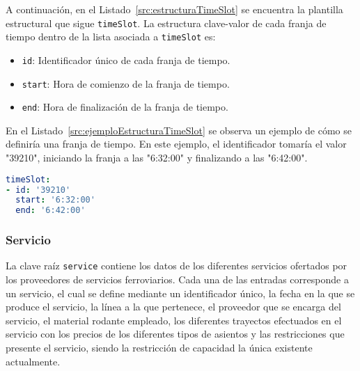 A continuación, en el Listado~\ref{src:estructuraTimeSlot} se encuentra la plantilla estructural que sigue \texttt{timeSlot}. La estructura clave-valor de cada franja de tiempo dentro de la lista asociada a \texttt{timeSlot} es:

\begin{itemize}
    \item \texttt{id}: Identificador único de cada franja de tiempo.
    \item \texttt{start}: Hora de comienzo de la franja de tiempo.
    \item \texttt{end}: Hora de finalización de la franja de tiempo.
\end{itemize}

En el Listado~\ref{src:ejemploEstructuraTimeSlot} se observa un ejemplo de cómo se definiría una franja de tiempo. En este ejemplo, el identificador tomaría el valor "39210", iniciando la franja a las "6:32:00" y finalizando a las "6:42:00".

\begin{lstlisting}[language=YAML,
                   frame=none,
                   numbers=none,
                   basicstyle=\ttfamily\normalsize,
                   caption={Ejemplo con datos reales de la estructura de \texttt{timeSlot}},
                   label=src:ejemploEstructuraTimeSlot,
                   inputencoding=utf8]
timeSlot:
- id: '39210'
  start: '6:32:00'
  end: '6:42:00'
\end{lstlisting}

\subsubsection{Servicio}

La clave raíz \texttt{service} contiene los datos de los diferentes servicios ofertados por los proveedores de servicios ferroviarios. Cada una de las entradas corresponde a un servicio, el cual se define mediante un identificador único, la fecha en la que se produce el servicio, la línea a la que pertenece, el proveedor que se encarga del servicio, el material rodante empleado, los diferentes trayectos efectuados en el servicio con los precios de los diferentes tipos de asientos y las restricciones que presente el servicio, siendo la restricción de capacidad la única existente actualmente.

